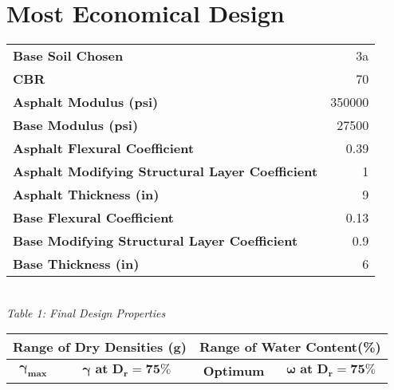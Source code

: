 \documentclass{article}
\begin{document}
\section{Most Economical Design}
\begin{center}
    \begin{tabular}{|l|r|}
    \hline
    \textbf{Base Soil Chosen}                               & 3a  \\
    \textbf{CBR}                                              & 70  \\
    \textbf{Asphalt Modulus (psi)}                            & 350000  \\
    \textbf{Base Modulus (psi)}                               & 27500  \\
    \textbf{Asphalt Flexural Coefficient}                     & 0.39  \\
    \textbf{Asphalt Modifying Structural Layer Coefficient} & 1  \\
    \textbf{Asphalt Thickness (in)} & 9  \\
    \textbf{Base Flexural Coefficient}                        & 0.13  \\
    \textbf{Base Modifying Structural Layer Coefficient}  & 0.9  \\
    \textbf{Base Thickness (in)} & 6  \\\hline
    \end{tabular}
    \vspace{3mm}
    \emph{\\Table 1: Final Design Properties\\}
    \vspace{10mm}
    \begin{tabular}{|c|c|c|c|}
        \hline
        \multicolumn{2}{|c|}{\textbf{Range of Dry Densities (g)}}      & \multicolumn{2}{|c|}{\textbf{Range of Water Content(\%)}}          \\\hline
        $\bm{\gamma_\textbf{max}}$ & $\bm{\gamma \text{ at } D_r=75\%}$ & \textbf{Optimum} & $\bm{\omega \textbf{ at } D_r=75\%}$ \\

\end{tabular}
\end{center}
\end{document}
